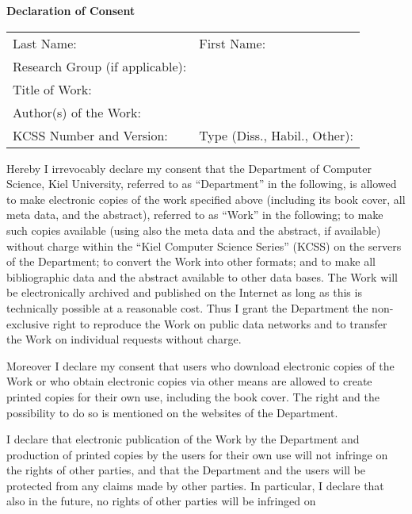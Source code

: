 \documentclass[11pt,oneside]{article}
\begin{document}
\thispagestyle{empty}
\enlargethispage{2\baselineskip}
\begin{center}
  \Large
  \textbf{Declaration of Consent}
  \normalsize
\end{center}
\medskip
\begin{tabular}[t]{@{}p{}@{}p{}@{}}
  Last Name: & First Name: \\[\baselineskip]
  Research Group (if applicable): \\[\baselineskip]
  Title of Work: \\[2\baselineskip]
  Author(s) of the Work: \\[\baselineskip]
  KCSS Number and Version: & Type (Diss.\@, Habil.\@, Other):
\end{tabular}
\par\bigskip
%
%
Hereby I irrevocably declare my consent
that the Department of Computer Science, Kiel University, referred to as \enquote{Department} in the following,
is allowed to make electronic copies of the work specified above
(including its book cover, all meta data, and the abstract),
referred to as \enquote{Work} in the following;
to make such copies available
(using also the meta data and the abstract, if available)
without charge
within the \enquote{Kiel Computer Science Series} (KCSS)
on the servers of the Department;
to convert the Work into other formats;
and to make all bibliographic data and the abstract
available to other data bases.
The Work will be electronically archived and published on the Internet
as long as this is technically possible at a reasonable cost.
Thus I grant the Department
the non-exclusive right to reproduce the Work on public data networks
and to transfer the Work on individual requests without charge.
\par
%
%
Moreover I declare my consent
that users who download electronic copies of the Work
or who obtain electronic copies via other means
are allowed to create printed copies for their own use,
including the book cover.
The right and the possibility to do so is mentioned
on the websites of the Department.
\par
%
%
I declare that electronic publication of the Work by the Department
and production of printed copies by the users for their own use
will not infringe on the rights of other parties,
and that the Department and the users will be protected from any claims made by other parties.
%
%
In particular, I declare that also in the future,
no rights of other parties will be infringed on
\end{document}
